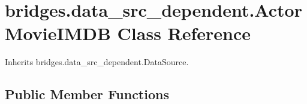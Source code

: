 \hypertarget{classbridges_1_1data__src__dependent_1_1_actor_movie_i_m_d_b}{}\section{bridges.\+data\+\_\+src\+\_\+dependent.\+Actor\+Movie\+I\+M\+D\+B Class Reference}
\label{classbridges_1_1data__src__dependent_1_1_actor_movie_i_m_d_b}


Inherits bridges.\+data\+\_\+src\+\_\+dependent.\+Data\+Source.

\subsection*{Public Member Functions}
